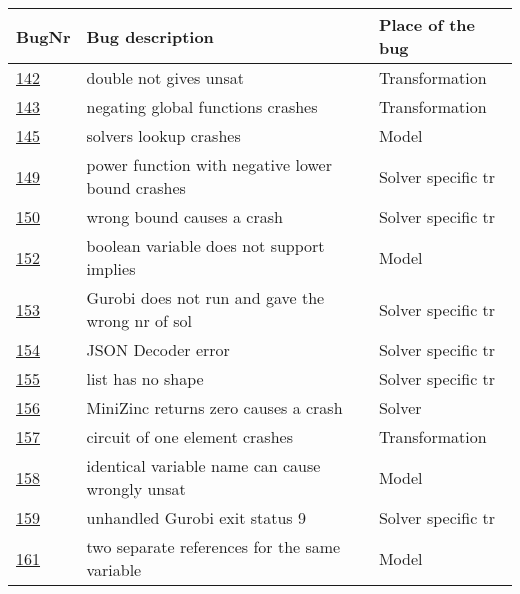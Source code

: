 \begin{table}[]
	\centering
	\begin{tabular}{lll}
		BugNr & Bug description                                         & Place of the bug \\ \toprule
		\href{https://github.com/CPMpy/cpmpy/issues/142}{142} & double not gives unsat                            & Transformation     \\
		\href{https://github.com/CPMpy/cpmpy/issues/143}{143} & negating global functions crashes                 & Transformation     \\
		\href{https://github.com/CPMpy/cpmpy/issues/145}{145} & solvers lookup crashes                            & Model              \\
		\href{https://github.com/CPMpy/cpmpy/issues/149}{149} & power function with negative lower bound crashes  & Solver specific tr \\
		\href{https://github.com/CPMpy/cpmpy/issues/150}{150} & wrong bound causes a crash                  & Solver specific tr \\
		\href{https://github.com/CPMpy/cpmpy/issues/152}{152} & boolean variable does not support implies         & Model              \\
		\href{https://github.com/CPMpy/cpmpy/issues/153}{153} & Gurobi does not run and gave the wrong nr of sol  & Solver specific tr \\
		\href{https://github.com/CPMpy/cpmpy/issues/154}{154} & JSON Decoder error                                & Solver specific tr \\
		\href{https://github.com/CPMpy/cpmpy/issues/155}{155} & list has no shape                                 & Solver specific tr \\
		\href{https://github.com/CPMpy/cpmpy/issues/156}{156} & MiniZinc returns zero causes a crash              & Solver             \\
		\href{https://github.com/CPMpy/cpmpy/issues/157}{157} & circuit of one element crashes                    & Transformation     \\
		\href{https://github.com/CPMpy/cpmpy/issues/158}{158} & identical variable name can cause wrongly unsat   & Model              \\
		\href{https://github.com/CPMpy/cpmpy/issues/159}{159} & unhandled Gurobi exit status 9                    & Solver specific tr \\
		\href{https://github.com/CPMpy/cpmpy/issues/161}{161} & two separate references for the same variable     & Model              \\

\end{tabular}
\end{table}

